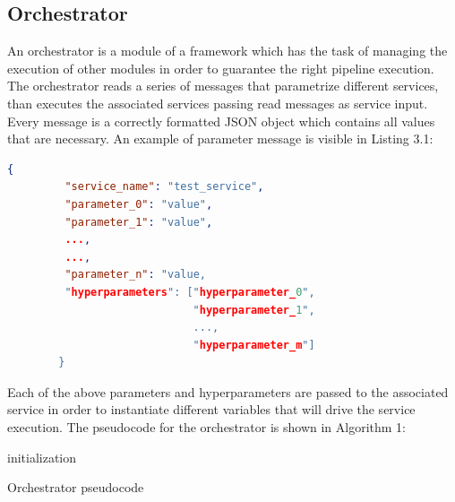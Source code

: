 \documentclass[\main/main.tex]{subfiles}
\begin{document}
\subsection{Orchestrator}
An orchestrator is a module of a framework which has the task of managing the execution of other modules in order to guarantee the right pipeline execution. The orchestrator reads a series of messages that parametrize different services, than executes the associated services passing read messages as service input. Every message is a correctly formatted JSON object which contains all values that are necessary. An example of parameter message is visible in Listing 3.1:
\\
\begin{center}
    \begin{lstlisting}[language=json, caption="Parameter message example", captionpos=b]
        {
         "service_name": "test_service",
         "parameter_0": "value",
         "parameter_1": "value",
         ...,
         ...,
         "parameter_n": "value,
         "hyperparameters": ["hyperparameter_0", 
                             "hyperparameter_1", 
                             ..., 
                             "hyperparameter_m"]
        }
    \end{lstlisting}
\end{center}

Each of the above parameters and hyperparameters are passed to the associated service in order to instantiate different variables that will drive the service execution.
The pseudocode for the orchestrator is shown in Algorithm 1:
\begin{center}
    \begin{algorithm}[H]
     initialization\;
     \caption{Orchestrator pseudocode}
    \end{algorithm}
\end{center}
\end{document}
